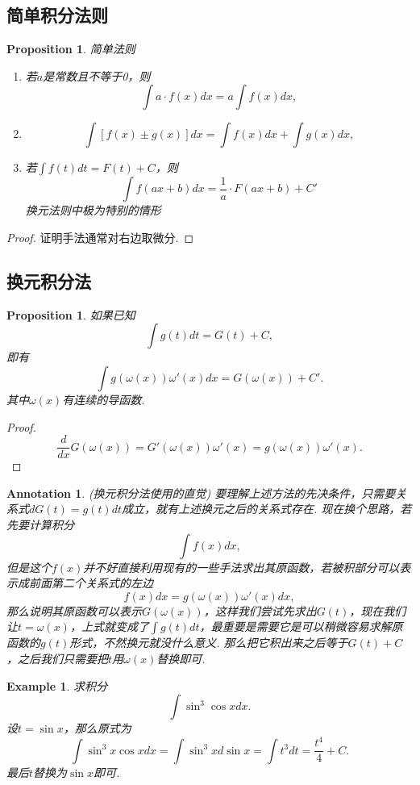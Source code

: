 \documentclass{article}
\newtheorem{proposition}[theorem]{Proposition}
\newtheorem{example}[theorem]{Example}
\newtheorem{annotation}[theorem]{Annotation}
\begin{document}
\subsection{简单积分法则}

\begin{proposition}
\rm 简单法则
\begin{enumerate}
	\item 若$a$是常数且不等于0，则
	$$
	\int a\cdot f(x)dx = a \int f(x)dx,
	$$
	\item 
	$$
	\int \left[ f(x) \pm  g(x) \right]dx = \int f(x)dx + \int g(x)dx,
	$$
	\item 若$\int f(t)dt = F(t)+C$，则
	$$
	\int f(ax+b)dx = \frac{1}{a}\cdot F(ax+b)+C'
	$$
	{\color{red} 换元法则中极为特别的情形}
\end{enumerate}
\end{proposition}

\begin{proof}
{\color{blue}证明手法通常对右边取微分}.
\end{proof}


\subsection{换元积分法}
\begin{proposition}
\rm 如果已知
$$
\int g(t)dt = G(t)+C,
$$
即有
$$
\int g(\omega(x))\omega'(x)dx = G(\omega(x)) + C'.
$$
其中$\omega(x)$有连续的导函数. 
\end{proposition}

\begin{proof}
$$
\frac{d}{dx}G(\omega(x)) = G'(\omega(x))\omega'(x) = g(\omega(x))\omega'(x).
$$
\end{proof}

\begin{annotation}
\rm {\color{red} (换元积分法使用的直觉)} 要理解上述方法的先决条件，只需要关系式$dG(t)=g(t)dt$成立，就有上述换元之后的关系式存在. 现在换个思路，若先要计算积分
$$
\int f(x)dx,
$$
但是这个$f(x)$并不好直接利用现有的一些手法求出其原函数，若被积部分可以表示成前面第二个关系式的左边
$$
f(x)dx = g(\omega(x))\omega'(x)dx,
$$
那么说明其原函数可以表示$G(\omega(x))$，这样我们尝试先求出$G(t)$，现在我们让$t=\omega(x)$，上式就变成了$\int g(t)dt$，{\color{blue}最重要是需要它是可以稍微容易求解原函数的$g(t)$形式，不然换元就没什么意义}. 那么把它积出来之后等于$G(t)+C$，之后我们只需要把$t$用$\omega(x)$替换即可.
\end{annotation}

\begin{example}
\rm 求积分
$$
\int \sin^3\cos xdx.
$$
设$t=\sin x$，那么原式为
$$
\int \sin^3x\cos xdx = \int \sin^3xd\sin x = \int t^3 dt = \frac{t^4}{4}+C.
$$
最后$t$替换为$\sin x$即可.
\end{example}
\end{document}
